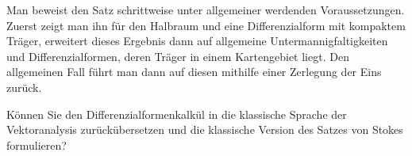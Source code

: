 \begin{antwort}

  \medskip\noindent%
  Man beweist den Satz schrittweise unter allgemeiner werdenden Voraussetzungen. 
  Zuerst zeigt man ihn für den Halbraum und eine 
  Differenzialform mit kompaktem Träger, erweitert dieses Ergebnis dann auf 
  allgemeine Untermannigfaltigkeiten und Differenzialformen, deren 
  Träger in einem Kartengebiet liegt. Den allgemeinen Fall führt man dann 
  auf diesen mithilfe einer Zerlegung der Eins zurück. 
  \AntEnd
\end{antwort} 

\begin{frage}\label{tausend}
  Können Sie den Differenzialformenkalkül in die 
  klassische Sprache der Vektoranalysis zurückübersetzen und 
  die klassische Version des Satzes von Stokes formulieren?
\end{frage}  

